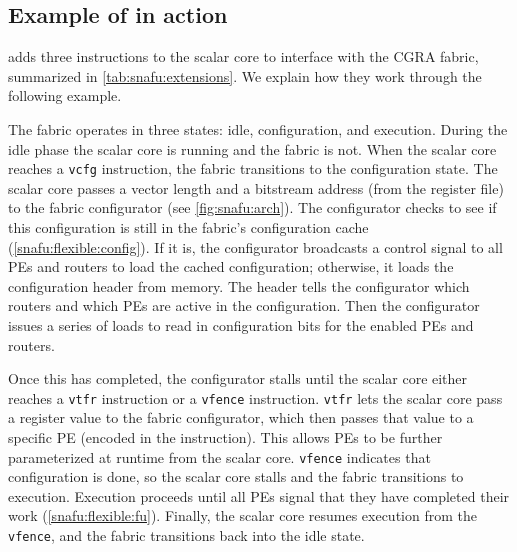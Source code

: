 \subsection{Example of \snafuarch in action}

\snafuarch adds three instructions to the scalar core to interface with the CGRA fabric,
summarized in \autoref{tab:snafu:extensions}.
We explain how they work through the following example.

The \snafuframe fabric operates in three states: idle, configuration, and execution.
% 
During the idle phase the scalar core is running and the fabric is not.
% 
When the scalar core reaches a {\tt vcfg} instruction, the fabric transitions to the configuration state.
% 
The scalar core passes a vector length and a bitstream address (from the register file) to the fabric configurator (see \autoref{fig:snafu:arch}).
% 
The configurator checks to see if this configuration is still in the fabric's configuration cache (\autoref{snafu:flexible:config}).
%
If it is, the configurator broadcasts a control signal to all PEs and routers to load the cached configuration;
otherwise, it loads the configuration header from memory.
% 
The header tells the configurator which routers and which PEs are active in the configuration.
% 
Then the configurator issues a series of loads to read in configuration bits for the enabled PEs and routers.
 
Once this has completed, the configurator stalls until the scalar core either reaches a {\tt vtfr} instruction or a {\tt vfence} instruction.
% 
{\tt vtfr} lets the scalar core pass a register value to the fabric configurator, which then passes that value to a specific PE (encoded in the instruction).
% 
This allows PEs to be further parameterized at runtime from the scalar core. %
% 
{\tt vfence} indicates that configuration is done, so the scalar core stalls and the fabric transitions to execution.
% 
Execution proceeds until all PEs signal that they have completed their work (\autoref{snafu:flexible:fu}).
%
Finally, the scalar core resumes execution from the {\tt vfence}, and the fabric transitions back into the idle state.
